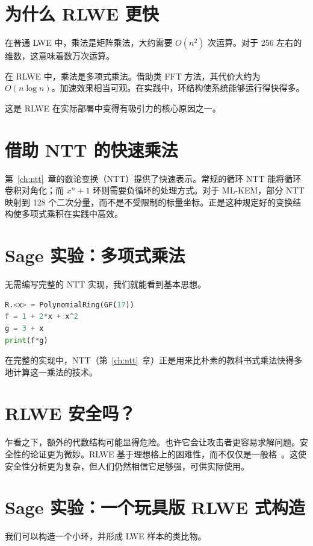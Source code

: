 \section{为什么 RLWE 更快}

在普通 LWE 中，乘法是矩阵乘法，大约需要 $O(n^2)$ 次运算。对于 $256$ 左右的维数，这意味着数万次运算。

在 RLWE 中，乘法是多项式乘法。借助类 FFT 方法，其代价大约为 $O(n\log n)$。加速效果相当可观。在实践中，环结构使系统能够运行得快得多。

这是 RLWE 在实际部署中变得有吸引力的核心原因之一。

\section{借助 NTT 的快速乘法}

第~\ref{ch:ntt}~章的数论变换（NTT）提供了快速表示。常规的循环 NTT 能将循环卷积对角化；而 $x^n+1$ 环则需要负循环的处理方式。对于 ML-KEM，部分 NTT 映射到 128 个二次分量，而不是不受限制的标量坐标。正是这种规定好的变换结构使多项式乘积在实践中高效。

\section{Sage 实验：多项式乘法}

无需编写完整的 NTT 实现，我们就能看到基本思想。

\begin{lstlisting}[language=Python]
R.<x> = PolynomialRing(GF(17))
f = 1 + 2*x + x^2
g = 3 + x
print(f*g)
\end{lstlisting}

在完整的实现中，NTT（第~\ref{ch:ntt}~章）正是用来比朴素的教科书式乘法快得多地计算这一乘法的技术。

\section{RLWE 安全吗？}

乍看之下，额外的代数结构可能显得危险。也许它会让攻击者更容易求解问题。安全性的论证更为微妙。RLWE 基于理想格上的困难性，而不仅仅是一般格~\cite{lpr2010}。这使安全性分析更为复杂，但人们仍然相信它足够强，可供实际使用。

\section{Sage 实验：一个玩具版 RLWE 式构造}

我们可以构造一个小环，并形成 LWE 样本的类比物。

